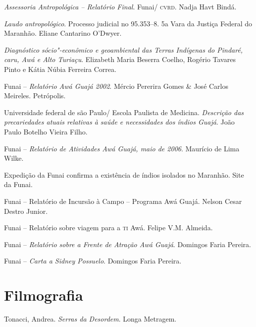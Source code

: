 \begin{itemize}
{\item[2000] \emph{Assessoria Antropológica -- Relatório Final}. Funai/
\textsc{cvrd}. Nadja Havt Bindá.

\item[2001] \emph{Laudo antropológico}. Processo judicial no
95.353--8. 5a Vara da Justiça Federal do Maranhão. Eliane Cantarino
O'Dwyer.

\item[2001] \emph{Diagnóstico sócio"-econômico e geoambiental das
Terras Indígenas do Pindaré, caru, Awá e Alto Turiaçu}. Elizabeth Maria
Beserra Coelho, Rogério Tavares Pinto e Kátia Núbia Ferreira Correa.

\item[2002] Funai -- \emph{Relatório Awá Guajá 2002}. Mércio Pererira
Gomes \& José Carlos Meireles. Petrópolis.

\item[2002] Universidade federal de são Paulo/ Escola Paulista de
Medicina. \emph{Descrição das precariedades atuais relativas à saúde e
necessidades dos índios Guajá}. João Paulo Botelho Vieira Filho.

\item[2006] Funai -- \emph{Relatório de Atividades Awá Guajá, maio de
2006}. Maurício de Lima Wilke.

\item[2009] Expedição da Funai confirma a existência de índios
isolados no Maranhão. Site da Funai.

\item[2013] Funai -- Relatório de Incursão à Campo -- Programa Awá
Guajá. Nelson Cesar Destro Junior.

\item[2013] Funai -- Relatório sobre viagem para a \textsc{ti} Awá. Felipe V.M.
Almeida.

\item[s/d] Funai -- \emph{Relatório sobre a Frente de Atração
Awá Guajá}. Domingos Faria Pereira.

\item[s/d] Funai -- \emph{Carta a Sidney Possuelo}. Domingos Faria
Pereira.

\section{Filmografia}

\item[2006] Tonacci, Andrea. \emph{Serras da Desordem}. Longa Metragem.
}
\end{itemize}

